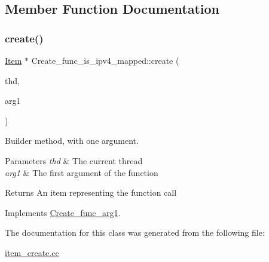 \subsection{Member Function Documentation}
\mbox{\label{classCreate__func__is__ipv4__mapped_a404f5bfae1d75555eaf30b5e74600da1}} 
\subsubsection{\texorpdfstring{create()}{create()}}
{\footnotesize\ttfamily \mbox{\hyperlink{classItem}{Item}} $\ast$ Create\+\_\+func\+\_\+is\+\_\+ipv4\+\_\+mapped\+::create (\begin{DoxyParamCaption}\item[{T\+HD $\ast$}]{thd,  }\item[{\mbox{\hyperlink{classItem}{Item}} $\ast$}]{arg1 }\end{DoxyParamCaption})\hspace{0.3cm}{\ttfamily [virtual]}}

Builder method, with one argument. 
\begin{DoxyParams}{Parameters}
{\em thd} & The current thread \\
\hline
{\em arg1} & The first argument of the function \\
\hline
\end{DoxyParams}
\begin{DoxyReturn}{Returns}
An item representing the function call 
\end{DoxyReturn}


Implements \mbox{\hyperlink{classCreate__func__arg1_a3e9a98f755cd82c3e762e334c955a8c9}{Create\+\_\+func\+\_\+arg1}}.



The documentation for this class was generated from the following file\+:\begin{DoxyCompactItemize}
\item 
\mbox{\hyperlink{item__create_8cc}{item\+\_\+create.\+cc}}\end{DoxyCompactItemize}

